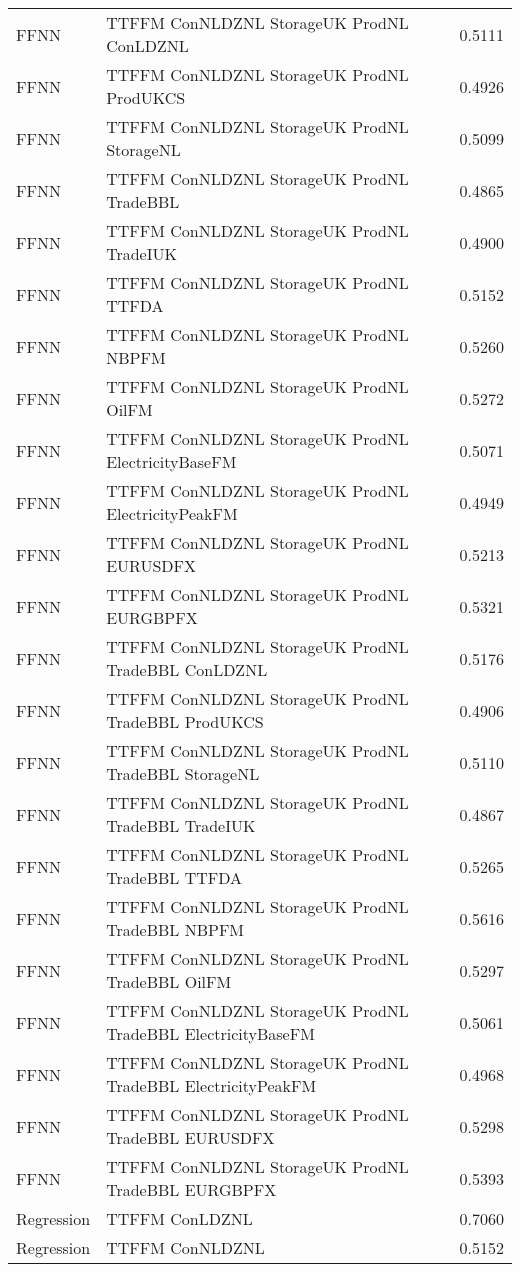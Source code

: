\begin{table}[h!]
\begin{adjustbox}{max width=\textwidth}
\begin{tabular}{llr}
  FFNN & TTFFM ConNLDZNL StorageUK ProdNL ConLDZNL & 0.5111 \\ 
  FFNN & TTFFM ConNLDZNL StorageUK ProdNL ProdUKCS & 0.4926 \\ 
  FFNN & TTFFM ConNLDZNL StorageUK ProdNL StorageNL & 0.5099 \\ 
  FFNN & TTFFM ConNLDZNL StorageUK ProdNL TradeBBL & 0.4865 \\ 
  FFNN & TTFFM ConNLDZNL StorageUK ProdNL TradeIUK & 0.4900 \\ 
  FFNN & TTFFM ConNLDZNL StorageUK ProdNL TTFDA & 0.5152 \\ 
  FFNN & TTFFM ConNLDZNL StorageUK ProdNL NBPFM & 0.5260 \\ 
  FFNN & TTFFM ConNLDZNL StorageUK ProdNL OilFM & 0.5272 \\ 
  FFNN & TTFFM ConNLDZNL StorageUK ProdNL ElectricityBaseFM & 0.5071 \\ 
  FFNN & TTFFM ConNLDZNL StorageUK ProdNL ElectricityPeakFM & 0.4949 \\ 
  FFNN & TTFFM ConNLDZNL StorageUK ProdNL EURUSDFX & 0.5213 \\ 
  FFNN & TTFFM ConNLDZNL StorageUK ProdNL EURGBPFX & 0.5321 \\ 
  FFNN & TTFFM ConNLDZNL StorageUK ProdNL TradeBBL ConLDZNL & 0.5176 \\ 
  FFNN & TTFFM ConNLDZNL StorageUK ProdNL TradeBBL ProdUKCS & 0.4906 \\ 
  FFNN & TTFFM ConNLDZNL StorageUK ProdNL TradeBBL StorageNL & 0.5110 \\ 
  FFNN & TTFFM ConNLDZNL StorageUK ProdNL TradeBBL TradeIUK & 0.4867 \\ 
  FFNN & TTFFM ConNLDZNL StorageUK ProdNL TradeBBL TTFDA & 0.5265 \\ 
  FFNN & TTFFM ConNLDZNL StorageUK ProdNL TradeBBL NBPFM & 0.5616 \\ 
  FFNN & TTFFM ConNLDZNL StorageUK ProdNL TradeBBL OilFM & 0.5297 \\ 
  FFNN & TTFFM ConNLDZNL StorageUK ProdNL TradeBBL ElectricityBaseFM & 0.5061 \\ 
  FFNN & TTFFM ConNLDZNL StorageUK ProdNL TradeBBL ElectricityPeakFM & 0.4968 \\ 
  FFNN & TTFFM ConNLDZNL StorageUK ProdNL TradeBBL EURUSDFX & 0.5298 \\ 
  FFNN & TTFFM ConNLDZNL StorageUK ProdNL TradeBBL EURGBPFX & 0.5393 \\ 
  Regression & TTFFM ConLDZNL & 0.7060 \\ 
  Regression & TTFFM ConNLDZNL & 0.5152 \\ 

\end{tabular}
\end{adjustbox}
\end{table}
